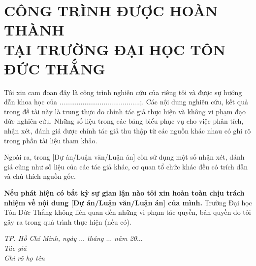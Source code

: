 \chapter*{CÔNG TRÌNH ĐƯỢC HOÀN THÀNH\\TẠI TRƯỜNG ĐẠI HỌC TÔN ĐỨC THẮNG}
Tôi xin cam đoan đây là công trình nghiên cứu của riêng tôi và được sự hướng dẫn khoa học của ..........................................;. Các nội dung nghiên cứu, kết quả trong đề tài này là trung thực do chính tác giả thực hiện và không vi phạm đạo đức nghiên cứu. Những số liệu trong các bảng biểu phục vụ cho việc phân tích, nhận xét, đánh giá được chính tác giả thu thập từ các nguồn khác nhau có ghi rõ trong phần tài
liệu tham khảo.

Ngoài ra, trong [Dự án/Luận văn/Luận án] còn sử dụng một số nhận xét, đánh giá cũng như số liệu của các tác giả khác, cơ quan tổ chức khác đều có trích dẫn và chú thích
nguồn gốc.

\textbf{Nếu phát hiện có bất kỳ sự gian lận nào tôi xin hoàn toàn chịu trách nhiệm về nội dung [Dự án/Luận văn/Luận án] của mình.} Trường Đại học Tôn Đức Thắng không liên quan đến những vi phạm tác quyền, bản quyền do tôi gây ra trong quá trình thực hiện (nếu có).

\vspace*{1cm}
\begin{flushright}
	\begin{minipage}{8.75cm}
		\centering\itshape
		TP. Hồ Chí Minh, ngày $\ldots$ tháng $\ldots$ năm 20$\ldots$\\
		Tác giả\\[3cm]
		Ghi rõ họ tên
	\end{minipage}
\end{flushright}